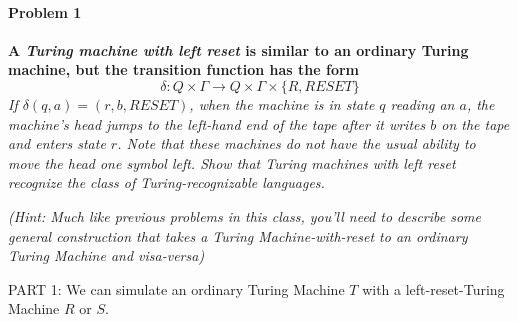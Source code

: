 \documentclass{article}
\begin{document}
\paragraph{Problem 1}
 \textbf{A {\em Turing machine with left reset} is similar to an ordinary Turing machine, but the transition function has the form}
  \begin{displaymath}
    \delta : Q \times \Gamma \to Q \times \Gamma \times \{R,RESET\}
  \end{displaymath}
\textit{If $\delta (q,a) = (r,b,RESET)$, when the machine is in state $q$ reading an $a$, the machine's head jumps to the left-hand end of the tape after it writes $b$ on the tape and enters state $r$. Note that these machines do not have the usual ability to move the head one symbol left. 
Show that Turing machines with left reset recognize the class of Turing-recognizable languages.}

  \textit{(Hint: Much like previous problems in this class, you'll need to describe some general construction that takes a Turing Machine-with-reset to an ordinary Turing Machine and visa-versa)} \newline \newline
  
\noindent PART 1:\newline  
  \noindent We can simulate an ordinary Turing Machine $T$ with a left-reset-Turing Machine $R$ or $S$. \newline
  
\end{document}
